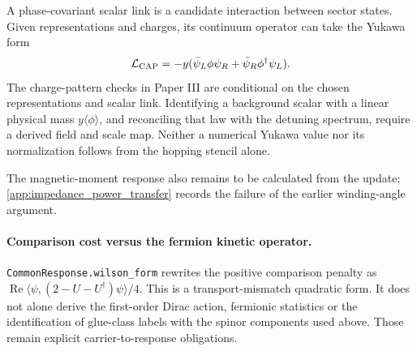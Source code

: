 A phase-covariant scalar link is a candidate interaction between sector states. Given representations and charges, its continuum operator can take the Yukawa form
\begin{equation}
 \mathcal L_{\rm CAP}=-y(\bar\psi_L\phi\psi_R+\bar\psi_R\phi^\dagger\psi_L).
 \label{eq:yukawa}
\end{equation}
The charge-pattern checks in Paper III are conditional on the chosen representations and scalar link. Identifying a background scalar with a linear physical mass $y\langle\phi\rangle$, and reconciling that law with the detuning spectrum, require a derived field and scale map. Neither a numerical Yukawa value nor its normalization follows from the hopping stencil alone.

The magnetic-moment response also remains to be calculated from the update; \cref{app:impedance_power_transfer} records the failure of the earlier winding-angle argument.


\paragraph{Comparison cost versus the fermion kinetic operator.}
\nolinkurl{CommonResponse.wilson_form} rewrites the positive comparison penalty as
$\operatorname{Re}\langle\psi,(2-U-U^\dagger)\psi\rangle/4$.
This is a transport-mismatch quadratic form. It does not alone derive the first-order
Dirac action, fermionic statistics or the identification of glue-class labels with the
spinor components used above. Those remain explicit carrier-to-response obligations.
